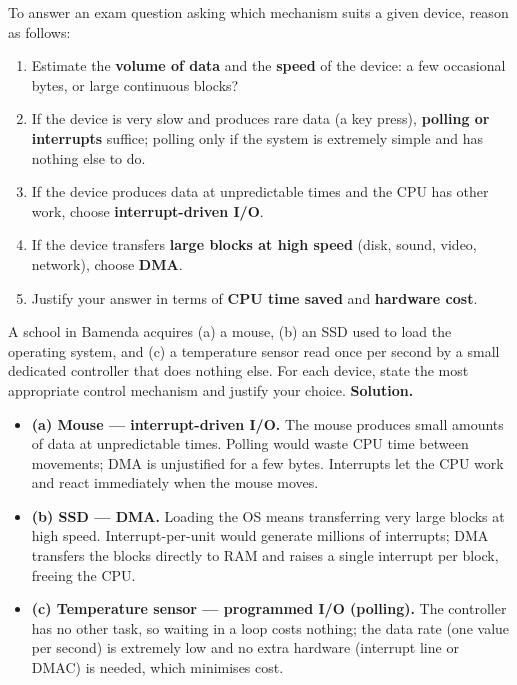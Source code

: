 \documentclass[11pt]{article}
\begin{document}
\begin{methode}
To answer an exam question asking which mechanism suits a given device, reason as follows:
\begin{enumerate}
\item Estimate the \textbf{volume of data} and the \textbf{speed} of the device: a few occasional bytes, or large continuous blocks?
\item If the device is very slow and produces rare data (a key press), \textbf{polling or interrupts} suffice; polling only if the system is extremely simple and has nothing else to do.
\item If the device produces data at unpredictable times and the CPU has other work, choose \textbf{interrupt-driven I/O}.
\item If the device transfers \textbf{large blocks at high speed} (disk, sound, video, network), choose \textbf{DMA}.
\item Justify your answer in terms of \textbf{CPU time saved} and \textbf{hardware cost}.
\end{enumerate}
\end{methode}

\begin{exoresolu}
A school in Bamenda acquires (a) a mouse, (b) an SSD used to load the operating system, and (c) a temperature sensor read once per second by a small dedicated controller that does nothing else. For each device, state the most appropriate control mechanism and justify your choice.
\tcblower
\textbf{Solution.}
\begin{itemize}
\item \textbf{(a) Mouse — interrupt-driven I/O.} The mouse produces small amounts of data at unpredictable times. Polling would waste CPU time between movements; DMA is unjustified for a few bytes. Interrupts let the CPU work and react immediately when the mouse moves.
\item \textbf{(b) SSD — DMA.} Loading the OS means transferring very large blocks at high speed. Interrupt-per-unit would generate millions of interrupts; DMA transfers the blocks directly to RAM and raises a single interrupt per block, freeing the CPU.
\item \textbf{(c) Temperature sensor — programmed I/O (polling).} The controller has no other task, so waiting in a loop costs nothing; the data rate (one value per second) is extremely low and no extra hardware (interrupt line or DMAC) is needed, which minimises cost.
\end{itemize}
\end{exoresolu}
\end{document}
